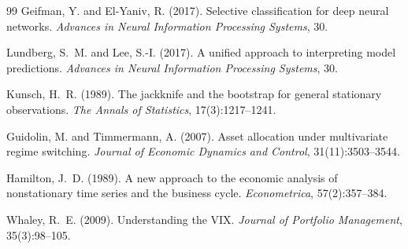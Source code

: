 \documentclass[12pt]{article}
\begin{document}
\begin{thebibliography}{99}
Geifman, Y. and El-Yaniv, R. (2017).
\newblock Selective classification for deep neural networks.
\newblock \emph{Advances in Neural Information Processing Systems}, 30.

Lundberg, S.~M. and Lee, S.-I. (2017).
\newblock A unified approach to interpreting model predictions.
\newblock \emph{Advances in Neural Information Processing Systems}, 30.

Kunsch, H.~R. (1989).
\newblock The jackknife and the bootstrap for general stationary observations.
\newblock \emph{The Annals of Statistics}, 17(3):1217--1241.

Guidolin, M. and Timmermann, A. (2007).
\newblock Asset allocation under multivariate regime switching.
\newblock \emph{Journal of Economic Dynamics and Control}, 31(11):3503--3544.

Hamilton, J.~D. (1989).
\newblock A new approach to the economic analysis of nonstationary time series and the business cycle.
\newblock \emph{Econometrica}, 57(2):357--384.

Whaley, R.~E. (2009).
\newblock Understanding the VIX.
\newblock \emph{Journal of Portfolio Management}, 35(3):98--105.

\end{thebibliography}
\end{document}
